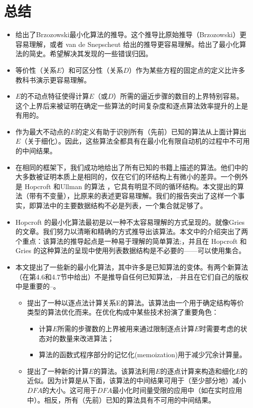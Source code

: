 \chapter{总结}


\begin{itemize}
    \item 给出了Brzozowski最小化算法的推导。这个推导比原始推导（Brzozowski）更容易理解，或者 van de Snepscheut 给出的推导更容易理解。给出了最小化算法的简史。希望解决其发现的一些错误归因。
    \item 等价性（关系$E$）和可区分性（关系$D$）作为某些方程的固定点的定义比许多教科书演示更容易理解。
    \item $E$的不动点特征使得计算$E$（或$D$）所需的逼近步骤的数目的上界特别容易。这个上界后来被证明在确定一些算法的时间复杂度和逐点算法效率提升的上是有用的。
    \item 作为最大不动点的$E$的定义有助于识别所有（先前）已知的算法从上面计算出$E$（关于细化）。因此，这些算法全都具有在最小化有限自动机的过程中不可用的中间结果。
    \item 在相同的框架下，我们成功地给出了所有已知的书籍上描述的算法。他们中的大多数被证明本质上是相同的，仅在它们的环结构上有微小的差异。一个例外是 Hopcroft 和Ullman 的算法 \cite{Hu79}，它具有明显不同的循环结构。本文提出的算法（带有不变量），比原来的表述更容易理解。我们的报告突出了这样一个事实，即算法中的主要数据结构不必是列表，一个集合就足够了。 
    \item Hopcroft 的最小化算法\cite{Hopc71}最初是以一种不太容易理解的方式呈现的。就像Gries的文章\cite{Grie73}。我们努力以清晰和精确的方式推导出该算法。本文中的介绍突出了两个重点：该算法的推导起点是一种易于理解的简单算法;，并且在 Hopcroft 和 Gries 的这种算法的呈现中使用列表数据结构是不必要的——可以使用集合。
    \item  本文提出了一些新的最小化算法，其中许多是已知算法的变体。有两个新算法（在第4.6和4.7节中给出）不是推导自任何已知算法，--并且在它们自己的版权中是重要的--。
    \begin{itemize}
        \item 提出了一种以逐点法计算关系E的算法。该算法由一个用于确定结构等价类型的算法优化而来。在优化构成中某些技术扮演了重要角色：
        \begin{itemize}
            \item 计算$E$所需的步骤数的上界被用来通过限制逐点计算$E$时需要考虑的状态对的数量来改进算法；
            \item 算法的函数式程序部分的记忆化(memoization)用于减少冗余计算量。 
        \end{itemize} 
        \item 提出了一种新的计算$E$的算法。该算法利用$E$的逐点计算来构造和细化$E$的近似。因为计算是从下面，该算法的中间结果可用于（至少部分地）减小$DFA$的大小。这可用于$DFA$最小化时间量受限的应用中（如在实时应用中）。相反，所有（先前）已知的算法具有不可用的中间结果。
    \end{itemize} 
\end{itemize}

\newpage
